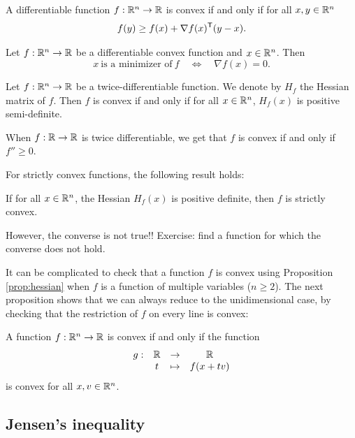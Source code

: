 \documentclass[11pt,nocut]{article}
\begin{document}
\begin{proposition}
	A differentiable function $f: \mathbb{R}^n \to \mathbb{R}$ is convex if and only if for all $x,y \in \mathbb{R}^n$
	$$
	f(y) \geq f(x) + \nabla f(x)^{{\sf T}} (y-x).
	$$
\end{proposition}

\begin{corollary}
	Let $f: \mathbb{R}^n \to \mathbb{R}$ be a differentiable convex function and $x \in \mathbb{R}^n$. Then
	$$
	x \ \text{is a minimizer of} \ f
	\quad \Longleftrightarrow \quad \nabla f(x) = 0.
	$$
\end{corollary}

\begin{proposition}\label{prop:hessian}
	Let $f: \mathbb{R}^n \to \mathbb{R}$ be a twice-differentiable function. We denote by $H_f$ the Hessian matrix of $f$.
	Then $f$ is convex if and only if for all $x \in \mathbb{R}^n$, $H_f(x)$ is positive semi-definite.
\end{proposition}
When $f: \mathbb{R} \to \mathbb{R}$ is twice differentiable, we get that $f$ is convex if and only if $f'' \geq 0$.

\begin{remark}
	For strictly convex functions, the following result holds:
	\begin{center}
		If for all $x \in \mathbb{R}^n$, the Hessian $H_f(x)$ is positive definite, then $f$ is strictly convex.
	\end{center}
	However, the converse is not true!! Exercise: find a function for which the converse does not hold.
\end{remark}

It can be complicated to check that a function $f$ is convex using Proposition \ref{prop:hessian} when $f$ is a function of multiple variables ($n \geq 2$). The next proposition shows that we can always reduce to the unidimensional case, by checking that the restriction of $f$ on every line is convex:

\begin{proposition}
	A function $f: \mathbb{R}^n \to \mathbb{R}$ is convex if and only if the function
	$$
	\begin{array}{rccc}
		g: & \mathbb{R} & \to & \mathbb{R} \\
		   & t & \mapsto & f(x+t v)
	\end{array}
	$$
	is convex for all $x,v \in \mathbb{R}^n$.
\end{proposition}

\subsection{Jensen's inequality}
\end{document}
